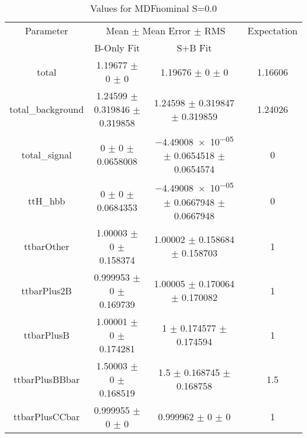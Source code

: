 \begin{table}
\centering
\caption{Values for MDFnominal S=0.0}
\begin{tabular}{cccc}
\toprule
Parameter & \multicolumn{2}{c}{Mean $\pm$ Mean Error $\pm$ RMS} & Expectation\\
 & B-Only Fit & S+B Fit & \\
\midrule
total & \num{1.19677} $\pm$ \num{0} $\pm$ \num{0} & \num{1.19676} $\pm$ \num{0} $\pm$ \num{0} & \num{1.16606}\\
total\_background & \num{1.24599} $\pm$ \num{0.319846} $\pm$ \num{0.319858} & \num{1.24598} $\pm$ \num{0.319847} $\pm$ \num{0.319859} & \num{1.24026}\\
total\_signal & \num{0} $\pm$ \num{0} $\pm$ \num{0.0658008} & \num{-4.49008e-05} $\pm$ \num{0.0654518} $\pm$ \num{0.0654574} & \num{0}\\
ttH\_hbb & \num{0} $\pm$ \num{0} $\pm$ \num{0.0684353} & \num{-4.49008e-05} $\pm$ \num{0.0667948} $\pm$ \num{0.0667948} & \num{0}\\
ttbarOther & \num{1.00003} $\pm$ \num{0} $\pm$ \num{0.158374} & \num{1.00002} $\pm$ \num{0.158684} $\pm$ \num{0.158703} & \num{1}\\
ttbarPlus2B & \num{0.999953} $\pm$ \num{0} $\pm$ \num{0.169739} & \num{1.00005} $\pm$ \num{0.170064} $\pm$ \num{0.170082} & \num{1}\\
ttbarPlusB & \num{1.00001} $\pm$ \num{0} $\pm$ \num{0.174281} & \num{1} $\pm$ \num{0.174577} $\pm$ \num{0.174594} & \num{1}\\
ttbarPlusBBbar & \num{1.50003} $\pm$ \num{0} $\pm$ \num{0.168519} & \num{1.5} $\pm$ \num{0.168745} $\pm$ \num{0.168758} & \num{1.5}\\
ttbarPlusCCbar & \num{0.999955} $\pm$ \num{0} $\pm$ \num{0} & \num{0.999962} $\pm$ \num{0} $\pm$ \num{0} & \num{1}\\
\bottomrule
\end{tabular}
\end{table}